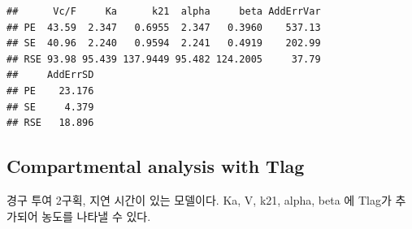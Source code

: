 \documentclass[
  11pt,
  krantz2, a4paper, twoside]{krantz}
\theoremstyle{definition}
\theoremstyle{definition}
\theoremstyle{definition}
\theoremstyle{definition}
\theoremstyle{remark}
\begin{document}
\begin{verbatim}
##      Vc/F     Ka      k21  alpha     beta AddErrVar
## PE  43.59  2.347   0.6955  2.347   0.3960    537.13
## SE  40.96  2.240   0.9594  2.241   0.4919    202.99
## RSE 93.98 95.439 137.9449 95.482 124.2005     37.79
##     AddErrSD
## PE    23.176
## SE     4.379
## RSE   18.896
\end{verbatim}

\hypertarget{compartmental-analysis-with-tlag-1}{%
\subsection{Compartmental analysis with Tlag}\label{compartmental-analysis-with-tlag-1}}

경구 투여 2구획, 지연 시간이 있는 모델이다. Ka, V, k21, alpha, beta 에 Tlag가 추가되어 농도를 나타낼 수 있다.
\end{document}
